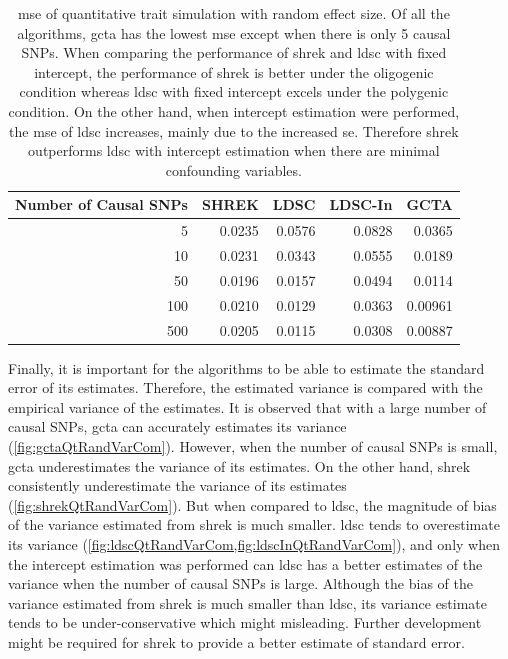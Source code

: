 \documentclass[12pt]{scrbook}
\begin{document}
\begin{table}
	\centering
	\begin{tabular}{rrrrr}
		\toprule
		Number of Causal SNPs&	SHREK&	LDSC&	LDSC-In&	GCTA \\
		\midrule
		5	&	0.0235	&	0.0576	&	0.0828	&	0.0365\\
		10	&	0.0231	&	0.0343	&	0.0555	&	0.0189\\
		50	&	0.0196	&	0.0157	&	0.0494	&	0.0114\\
		100	&	0.0210	&	0.0129	&	0.0363	&	0.00961\\
		500	&	0.0205	&	0.0115	&	0.0308	&	0.00887\\
		\bottomrule
	\end{tabular}
	\caption[MSE of Quantitative Trait Simulation with Random Effect Size]{
		\Gls{mse} of quantitative trait simulation with random effect size.
		Of all the algorithms, \gls{gcta} has the lowest \gls{mse} except when there is only 5 causal \glspl{SNP}.
		When comparing the performance of \gls{shrek} and \gls{ldsc} with fixed intercept, the performance of \gls{shrek} is better under the oligogenic condition whereas \gls{ldsc} with fixed intercept excels under the polygenic condition. 
		On the other hand, when intercept estimation were performed, the \gls{mse} of \gls{ldsc} increases, mainly due to the increased \gls{se}. 
		Therefore \gls{shrek} outperforms \gls{ldsc} with intercept estimation when there are minimal confounding variables.
	}
	\label{tab:mseQtRandom}
\end{table}
Finally, it is important for the algorithms to be able to estimate the standard error of its estimates. 
Therefore, the estimated variance is compared with the empirical variance of the estimates.
It is observed that with a large number of causal \glspl{SNP}, \gls{gcta} can accurately estimates its variance (\cref{fig:gctaQtRandVarCom}).
However, when the number of causal \glspl{SNP} is small, \gls{gcta} underestimates the variance of its estimates. 
On the other hand, \gls{shrek} consistently underestimate the variance of its estimates (\cref{fig:shrekQtRandVarCom}).
But when compared to \gls{ldsc}, the magnitude of bias of the variance estimated from \gls{shrek} is much smaller.
\gls{ldsc} tends to overestimate its variance (\cref{fig:ldscQtRandVarCom,fig:ldscInQtRandVarCom}), and only when the intercept estimation was performed can \gls{ldsc} has a better estimates of the variance when the number of causal \glspl{SNP} is large. 
Although the bias of the variance estimated from \gls{shrek} is much smaller than \gls{ldsc}, its variance estimate tends to be under-conservative which might misleading. 
Further development might be required for \gls{shrek} to provide a better estimate of standard error.
\end{document}
